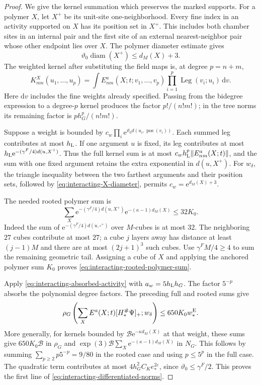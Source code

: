\documentclass[11pt,letterpaper,reqno]{amsart}
\newcommand{\dd}{\mathrm d}
\begin{document}
\begin{proof}
We give the kernel summation which preserves
the marked supports. For a polymer $X$, let
$X^+$ be its unit-site one-neighborhood.
Every fine index in an activity supported on
$X$ has its position set in $X^+$. This
includes both chamber sites in an internal
pair and the first site of an external
nearest-neighbor pair whose other endpoint
lies over $X$. The polymer diameter estimate
gives
\begin{equation}\label{eq:interacting-X-diameter}
 \vartheta_0\operatorname{diam}(X^+)\le d_M(X)+3 .
\end{equation}
The weighted kernel after substituting the
field maps is, at degree $p=n+m$,
\[
 K_{nm}^X(u_1,\ldots,u_p)=
 \int E^a_{nm}(X;t;v_1,\ldots,v_p)
           \prod_{i=1}^p\operatorname{Leg}(v_i;u_i)\,\dd v .
\]
Here $\dd v$ includes the fine weights already
specified. Passing from the bidegree expression
to a degree-$p$ kernel produces the factor
$p!/(n!m!)$; in the tree norms its remaining
factor is $p h_G^p/(n!m!)$.

Suppose a weight is bounded by
$c_w\prod_i \mathrm e^{\vartheta_0d(u_i,\operatorname{pos}(v_i))}$.
Each summed leg contributes at most $h_{\rm L}$.
If one argument $u$ is fixed, its leg contributes
at most
$h_{\rm L}\mathrm e^{-(\gamma^F/4)d(u,X^+)}$.
Thus the full kernel sum is at most
$c_wh_{\rm L}^p\|E^a_{nm}(X;t)\|$, and the
sum with one fixed argument retains the
extra exponential in $d(u,X^+)$.
For $w_\delta$, the triangle inequality between
the two farthest arguments and their position
sets, followed by \eqref{eq:interacting-X-diameter},
permits $c_w=\mathrm e^{d_M(X)+3}$.

The needed rooted polymer sum is
\begin{equation}\label{eq:interacting-rooted-polymer-sum}
 \sum_X \mathrm e^{-(\gamma^F/4)d(u,X^+)}
                       \mathrm e^{-(\kappa-1)d_M(X)}\le32K_0.
\end{equation}
Indeed the sum of
$\mathrm e^{-(\gamma^F/4)d(u,\square^+)}$ over $M$-cubes
is at most $32$. The neighboring $27$ cubes
contribute at most $27$; a cube $j$ layers
away has distance at least $(j-1)M$ and there
are at most $(2j+1)^3$ such cubes.
Use $\gamma^FM/4\ge4$ to sum the remaining
geometric tail. Assigning a cube of $X$
and applying the anchored polymer sum $K_0$
proves \eqref{eq:interacting-rooted-polymer-sum}.

Apply \eqref{eq:interacting-absorbed-activity}
with $a_w=5h_{\rm L}h_G$. The factor $5^{-p}$
absorbs the polynomial degree factors.
The preceding full and rooted sums give
\[
 \rho_G\left(\sum_X E^a(X;t)[H_*^\#\Psi]_+;w_\delta\right)
                                       \le650K_0w_*^{\rm E}.
\]
More generally, for kernels bounded by
$\mathcal B \mathrm e^{-\kappa d_M(X)}$ at that
weight, these sums give
$650K_0\mathcal B$ in $\rho_G$ and
$\exp(3)\mathcal B\sum_X\mathrm e^{-(\kappa-1)d_M(X)}$
in $N_G$. This follows by summing
$\sum_{p\ge2}p5^{-p}=9/80$ in the rooted
case and using $p\le5^p$ in the full case.
The quadratic term contributes at most
$4h_G^2C_Ke_*^{2\varepsilon}$, since
$\vartheta_0\le\gamma^F/2$. This proves the
first line of \eqref{eq:interacting-differentiated-norms}.


\end{proof}
\end{document}
